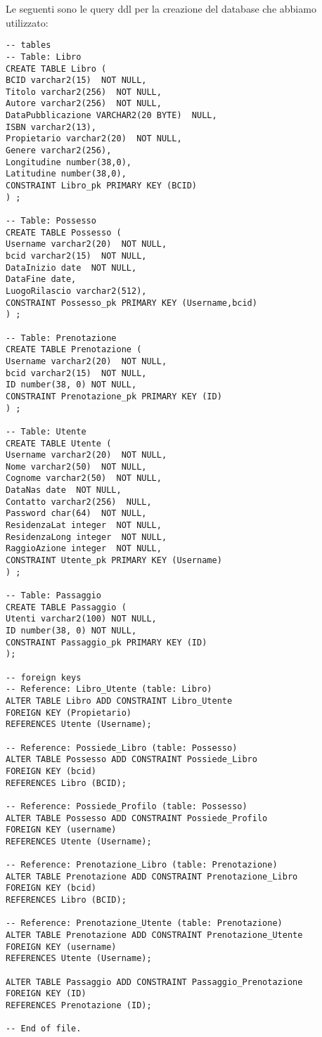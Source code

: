 Le seguenti sono le query ddl per la creazione del database che abbiamo utilizzato:
\begin{lstlisting}
-- tables
-- Table: Libro
CREATE TABLE Libro (
BCID varchar2(15)  NOT NULL,
Titolo varchar2(256)  NOT NULL,
Autore varchar2(256)  NOT NULL,
DataPubblicazione VARCHAR2(20 BYTE)  NULL,
ISBN varchar2(13),
Propietario varchar2(20)  NOT NULL,
Genere varchar2(256),
Longitudine number(38,0),
Latitudine number(38,0),
CONSTRAINT Libro_pk PRIMARY KEY (BCID)
) ;

-- Table: Possesso
CREATE TABLE Possesso (
Username varchar2(20)  NOT NULL,
bcid varchar2(15)  NOT NULL,
DataInizio date  NOT NULL,
DataFine date,
LuogoRilascio varchar2(512),
CONSTRAINT Possesso_pk PRIMARY KEY (Username,bcid)
) ;

-- Table: Prenotazione
CREATE TABLE Prenotazione (
Username varchar2(20)  NOT NULL,
bcid varchar2(15)  NOT NULL,
ID number(38, 0) NOT NULL,
CONSTRAINT Prenotazione_pk PRIMARY KEY (ID)
) ;

-- Table: Utente
CREATE TABLE Utente (
Username varchar2(20)  NOT NULL,
Nome varchar2(50)  NOT NULL,
Cognome varchar2(50)  NOT NULL,
DataNas date  NOT NULL,
Contatto varchar2(256)  NULL,
Password char(64)  NOT NULL,
ResidenzaLat integer  NOT NULL,
ResidenzaLong integer  NOT NULL,
RaggioAzione integer  NOT NULL,
CONSTRAINT Utente_pk PRIMARY KEY (Username)
) ;

-- Table: Passaggio
CREATE TABLE Passaggio (
Utenti varchar2(100) NOT NULL,
ID number(38, 0) NOT NULL,
CONSTRAINT Passaggio_pk PRIMARY KEY (ID)
);

-- foreign keys
-- Reference: Libro_Utente (table: Libro)
ALTER TABLE Libro ADD CONSTRAINT Libro_Utente
FOREIGN KEY (Propietario)
REFERENCES Utente (Username);

-- Reference: Possiede_Libro (table: Possesso)
ALTER TABLE Possesso ADD CONSTRAINT Possiede_Libro
FOREIGN KEY (bcid)
REFERENCES Libro (BCID);

-- Reference: Possiede_Profilo (table: Possesso)
ALTER TABLE Possesso ADD CONSTRAINT Possiede_Profilo
FOREIGN KEY (username)
REFERENCES Utente (Username);

-- Reference: Prenotazione_Libro (table: Prenotazione)
ALTER TABLE Prenotazione ADD CONSTRAINT Prenotazione_Libro
FOREIGN KEY (bcid)
REFERENCES Libro (BCID);

-- Reference: Prenotazione_Utente (table: Prenotazione)
ALTER TABLE Prenotazione ADD CONSTRAINT Prenotazione_Utente
FOREIGN KEY (username)
REFERENCES Utente (Username);

ALTER TABLE Passaggio ADD CONSTRAINT Passaggio_Prenotazione 
FOREIGN KEY (ID)
REFERENCES Prenotazione (ID);

-- End of file.


\end{lstlisting}
